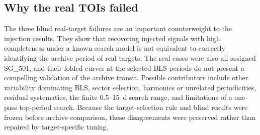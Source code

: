 \documentclass[11pt]{article}
\newcommand{\sg}[1]{\textsc{SG\_#1}}
\begin{document}
\subsection{Why the real TOIs failed}
The three blind real-target failures are an important counterweight to the injection results. They show that recovering injected signals with high completeness under a known search model is not equivalent to correctly identifying the archive period of real targets. The real cases were also all assigned \sg{501}, and their folded curves at the selected BLS periods do not present a compelling validation of the archive transit. Possible contributors include other variability dominating BLS, sector selection, harmonics or unrelated periodicities, residual systematics, the finite 0.5--15~d search range, and limitations of a one-pass top-period search. Because the target-selection rule and blind results were frozen before archive comparison, these disagreements were preserved rather than repaired by target-specific tuning.
\end{document}
